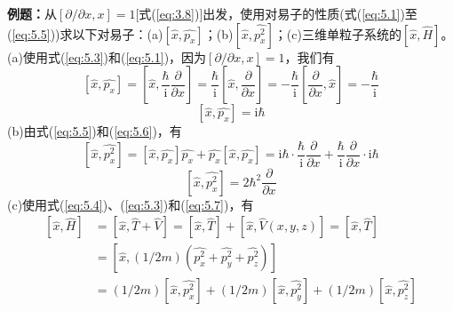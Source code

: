     \begin{examplebox}
        \textbf{例题：}从$\left[\partial/\partial x,x\right]=1$[式(\ref{eq:3.8})]出发，使用对易子的性质(式(\ref{eq:5.1})至(\ref{eq:5.5}))求以下对易子：(a)$\left[\hat{x},\hat{p_x}\right]$；(b)$\left[\hat{x}, \hat{p_x^2}\right]$；(c)三维单粒子系统的$\left[\hat{x},\hat{H}\right]$。
        \\
        (a)使用式(\ref{eq:5.3})和(\ref{eq:5.1})，因为$\left[\partial/\partial x,x\right]=1$，我们有
        \begin{equation*}
            \left[\hat{x},\hat{p_x}\right] = \left[\hat{x},\frac{\hbar}{\mathrm{i}}\frac{\partial}{\partial x}\right] = \frac{\hbar}{\mathrm{i}}\left[\hat{x},\frac{\partial}{\partial x}\right] = -\frac{\hbar}{\mathrm{i}}\left[\frac{\partial}{\partial x},\hat{x}\right] = -\frac{\hbar}{\mathrm{i}}
        \end{equation*}
        \begin{equation}
            \left[\hat{x},\hat{p_x}\right]=\mathrm{i}\hbar
            \label{eq:5.6}
        \end{equation}
        (b)由式(\ref{eq:5.5})和(\ref{eq:5.6})，有
        \begin{equation*}
            \left[\hat{x},\hat{p_x^2}\right] = \left[\hat{x},\hat{p_x}\right]\hat{p_x} + \hat{p_x}\left[\hat{x},\hat{p_x}\right] = \mathrm{i}\hbar\cdot\frac{\hbar}{\mathrm{i}}\frac{\partial}{\partial x} + \frac{\hbar}{\mathrm{i}}\frac{\partial}{\partial x} \cdot \mathrm{i}\hbar
        \end{equation*}
        \begin{equation}
            \left[\hat{x},\hat{p_x^2}\right] = 2\hbar^2\frac{\partial}{\partial x}
            \label{eq:5.7}
        \end{equation}
        (c)使用式(\ref{eq:5.4})、(\ref{eq:5.3})和(\ref{eq:5.7})，有
        \begin{equation*}
            \begin{aligned}
                \left[\hat{x},\hat{H}\right] &= \left[\hat{x},\hat{T}+\hat{V}\right] = \left[\hat{x},\hat{T}\right] + \left[\hat{x},\hat{V}\left(x,y,z\right)\right] =\left[\hat{x},\hat{T}\right] \\
                &= \left[\hat{x}, \left(1/2m\right)\left(\hat{p_x^2}+\hat{p_y^2}+\hat{p_z^2}\right)\right]\\
                &= \left(1/2m\right)\left[\hat{x},\hat{p_x^2}\right] + \left(1/2m\right)\left[\hat{x},\hat{p_y^2}\right] + \left(1/2m\right)\left[\hat{x},\hat{p_z^2}\right]\\

\end{aligned}
\end{equation*}
\end{examplebox}
